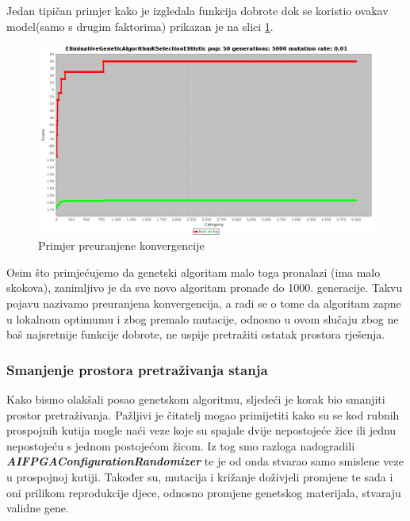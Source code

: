 \documentclass[times, utf8, zavrsni]{fer}
\begin{document}
	Jedan tipičan primjer kako je izgledala funkcija dobrote dok se koristio ovakav model(samo s drugim faktorima) prikazan je na slici \ref{fig:sv54-convergence}. 
	
	\begin{figure}[!htb]
		\centering
		\includegraphics[width=18cm]{slike/SV54Convergence.png}
		\caption{Primjer preuranjene konvergencije}
		\label{fig:sv54-convergence}
	\end{figure} 
	
	Osim što primjećujemo da genetski algoritam malo toga pronalazi (ima malo skokova), zanimljivo je da sve novo algoritam pronađe do 1000. generacije. Takvu pojavu nazivamo preuranjena konvergencija, a radi se o tome da algoritam zapne u lokalnom optimumu i zbog premalo mutacije, odnosno u ovom slučaju zbog ne baš najsretnije funkcije dobrote, ne uspije pretražiti ostatak prostora rješenja. 
	
	\subsubsection{Smanjenje prostora pretraživanja stanja}
	
	Kako bismo olakšali posao genetskom algoritmu, sljedeći je korak bio smanjiti prostor pretraživanja. Pažljivi je čitatelj mogao primijetiti kako su se kod rubnih prospojnih kutija mogle naći veze koje su spajale dvije nepostojeće žice ili jednu nepostojeću s jednom postojećom žicom. Iz tog smo razloga nadogradili \textbf{\emph{AIFPGAConfigurationRandomizer}} te je od onda stvarao samo smislene veze u prospojnoj kutiji. Također su, mutacija i križanje doživjeli promjene te sada i oni prilikom reprodukcije djece, odnosno promjene genetskog materijala, stvaraju validne gene. 
	
\end{document}
